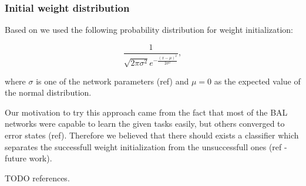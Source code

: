 \subsubsection{Initial weight distribution} 
\label{sec:our-sigma} 

Based on \citet{o1996bio} we used the following probability distribution for weight initialization: 

\begin{equation} 
\frac{1}{\sqrt{2\pi \sigma^2} e^{-\frac{(x-\mu)^2}{2\sigma^2}}},
\end{equation} 

where $\sigma$ is one of the network parameters (ref) and $\mu = 0$ as the expected value of the normal distribution. 

Our motivation to try this approach came from the fact that most of the BAL networks were capable to learn the given tasks easily, but others converged to error states (ref). Therefore we believed that there should exists a classifier which separates the successfull weight initialization from the unsuccessfull ones (ref - future work). 

TODO references.

